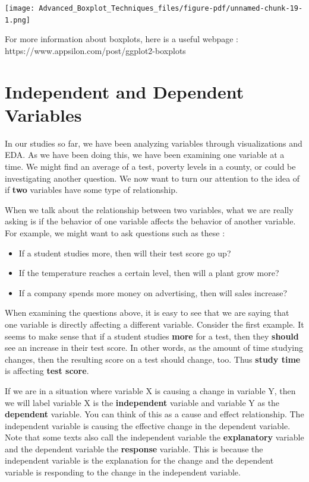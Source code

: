 \documentclass[
  letterpaper,
  DIV=11,
  numbers=noendperiod]{scrreprt}
\providecommand{\tightlist}{%
  \setlength{\itemsep}{0pt}\setlength{\parskip}{0pt}}\usepackage{longtable,booktabs,array}
\begin{document}
\texttt{[image: Advanced\_Boxplot\_Techniques\_files/figure-pdf/unnamed-chunk-19-1.png]}

For more information about boxplots, here is a useful webpage :
https://www.appsilon.com/post/ggplot2-boxplots


\chapter*{Independent and Dependent
Variables}\label{independent-and-dependent-variables}


In our studies so far, we have been analyzing variables through
visualizations and EDA. As we have been doing this, we have been
examining one variable at a time. We might find an average of a test,
poverty levels in a county, or could be investigating another question.
We now want to turn our attention to the idea of if \textbf{two}
variables have some type of relationship.

When we talk about the relationship between two variables, what we are
really asking is if the behavior of one variable affects the behavior of
another variable. For example, we might want to ask questions such as
these :

\begin{itemize}
\tightlist
\item
  If a student studies more, then will their test score go up?
\item
  If the temperature reaches a certain level, then will a plant grow
  more?
\item
  If a company spends more money on advertising, then will sales
  increase?
\end{itemize}

When examining the questions above, it is easy to see that we are saying
that one variable is directly affecting a different variable. Consider
the first example. It seems to make sense that if a student studies
\textbf{more} for a test, then they \textbf{should} see an increase in
their test score. In other words, as the amount of time studying
changes, then the resulting score on a test should change, too. Thus
\textbf{study time} is affecting \textbf{test score}.

If we are in a situation where variable X is causing a change in
variable Y, then we will label variable X is the \textbf{independent}
variable and variable Y as the \textbf{dependent} variable. You can
think of this as a cause and effect relationship. The independent
variable is causing the effective change in the dependent variable. Note
that some texts also call the independent variable the
\textbf{explanatory} variable and the dependent variable the
\textbf{response} variable. This is because the independent variable is
the explanation for the change and the dependent variable is responding
to the change in the independent variable.
\end{document}
